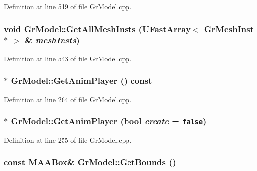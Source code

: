 Definition at line 519 of file GrModel.cpp.\hypertarget{class_gr_model_2c9c76c4d7715ab154fb9f89dd62d4d0}{
\subsubsection[{GetAllMeshInsts}]{\setlength{\rightskip}{0pt plus 5cm}void GrModel::GetAllMeshInsts ({\bf UFastArray}$<$ {\bf GrMeshInst} $\ast$ $>$ \& {\em meshInsts})}}
\label{class_gr_model_2c9c76c4d7715ab154fb9f89dd62d4d0}




Definition at line 543 of file GrModel.cpp.\hypertarget{class_gr_model_1759e9f0d11efd39892411dc80fd3312}{
\subsubsection[{GetAnimPlayer}]{ $\ast$ GrModel::GetAnimPlayer () const}}
\label{class_gr_model_1759e9f0d11efd39892411dc80fd3312}




Definition at line 264 of file GrModel.cpp.\hypertarget{class_gr_model_1d20cf8034ee3a0bd2fe1506fe81f73d}{
\subsubsection[{GetAnimPlayer}]{ $\ast$ GrModel::GetAnimPlayer (bool {\em create} = {\tt false})}}
\label{class_gr_model_1d20cf8034ee3a0bd2fe1506fe81f73d}




Definition at line 255 of file GrModel.cpp.\hypertarget{class_gr_model_3667043cfbdca6e413d4de9d0449aa5f}{
\subsubsection[{GetBounds}]{\setlength{\rightskip}{0pt plus 5cm}const {\bf MAABox}\& GrModel::GetBounds ()}}
\label{class_gr_model_3667043cfbdca6e413d4de9d0449aa5f}




